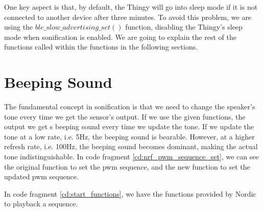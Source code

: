 

One key aspect is that, by default, the Thingy will go into sleep mode if it is not connected to another device after three minutes. To avoid this problem, we are using the $ble\_slow\_advertising\_set()$ function, disabling the Thingy's sleep mode when sonification is enabled. We are going to explain the rest of the functions called within the functions in the following sections.

\section{Beeping Sound}

The fundamental concept in sonification is that we need to change the speaker's tone every time we get the sensor's output. If we use the given functions, the output we get s beeping sound every time we update the tone. If we update the tone at a low rate, i.e. 5Hz, the beeping sound is bearable. However, at a higher refresh rate, i.e. 100Hz, the beeping sound becomes dominant, making the actual tone indistinguishable. In code fragment \ref{cd:nrf_pwm_sequence_set}, we can see the original function to set the \gls{pwm} sequence, and the new function to set the updated \gls{pwm} sequence.



In code fragment \ref{cd:start_functions}, we have the functions provided by Nordic to playback a sequence.


\makebox[\linewidth][c]{$\smash{\vdots}$}


\makebox[\linewidth][c]{$\smash{\vdots}$}

\makebox[\linewidth][c]{$\smash{\vdots}$}


